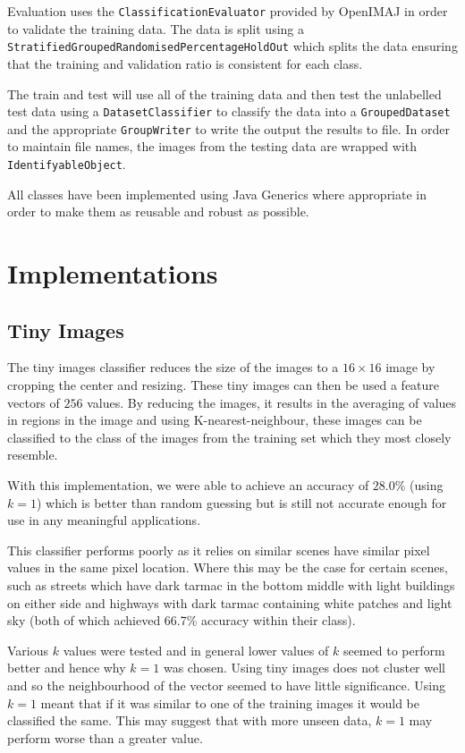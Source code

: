 \documentclass[paper=a4, fontsize=11pt]{article}
\begin{document}
Evaluation uses the \texttt{ClassificationEvaluator} provided by OpenIMAJ in order to validate the training data. The data is split using a \texttt{StratifiedGroupedRandomisedPercentageHoldOut} which splits the data ensuring that the training and validation ratio is consistent for each class.

The train and test will use all of the training data and then test the unlabelled test data using a \texttt{DatasetClassifier} to classify the data into a \texttt{GroupedDataset} and the appropriate \texttt{GroupWriter} to write the output the results to file. In order to maintain file names, the images from the testing data are wrapped with \texttt{IdentifyableObject}.

All classes have been implemented using Java Generics where appropriate in order to make them as reusable and robust as possible.

\section{Implementations}

\subsection{Tiny Images}

The tiny images classifier reduces the size of the images to a $16 \times 16$ image by cropping the center and resizing. These tiny images can then be used a feature vectors of $256$ values. By reducing the images, it results in the averaging of values in regions in the image and using K-nearest-neighbour, these images can be classified to the class of the images from the training set which they most closely resemble.

With this implementation, we were able to achieve an accuracy of $28.0\%$ (using $k=1$) which is better than random guessing but is still not accurate enough for use in any meaningful applications.

This classifier performs poorly as it relies on similar scenes have similar pixel values in the same pixel location. Where this may be the case for certain scenes, such as streets  which have dark tarmac in the bottom middle with light buildings on either side and highways with dark tarmac containing white patches and light sky (both of which achieved 66.7\% accuracy within their class).

Various $k$ values were tested and in general lower values of $k$ seemed to perform better and hence why $k=1$ was chosen. Using tiny images does not cluster well and so the neighbourhood of the vector seemed to have little significance. Using $k=1$ meant that if it was similar to one of the training images it would be classified the same. This may suggest that with more unseen data, $k=1$ may perform worse than a greater value.
\end{document}
